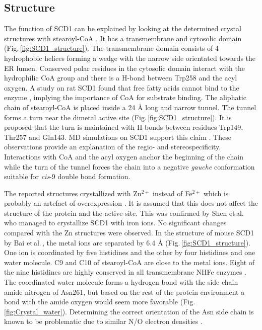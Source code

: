 \subsection{Structure}
The function of SCD1 can be explained by looking at the determined crystal structures with stearoyl-CoA \cite{Bai2015,Wang2015}. It has a transmembrane and cytosolic domain (Fig.\,\ref{fig:SCD1_structure}). The transmembrane domain consists of 4 hydrophobic helices forming a wedge with the narrow side orientated towards the ER lumen. Conserved polar residues in the cytosolic domain interact with the hydrophilic CoA group and there is a H-bond between Trp258 and the acyl oxygen. A study on rat SCD1 found that free fatty acids cannot bind to the enzyme \cite{Enoch1976}, implying the importance of CoA for substrate binding. The aliphatic chain of stearoyl-CoA is placed inside a 24 Å long and narrow tunnel. The tunnel forms a turn near the dimetal active site (Fig.\,\ref{fig:SCD1_structure}). It is proposed that the turn is maintained with H-bonds between residues Trp149, Thr257 and Gln143. MD simulations on SCD1 support this claim \cite{Petroff2021}. These observations provide an explanation of the regio- and stereospecificity. Interactions with CoA and the acyl oxygen anchor the beginning of the chain while the turn of the tunnel forces the chain into a negative \textit{gauche} conformation suitable for \textit{cis}-9 double bond formation. 

The reported structures crystallized with Zn$^{2+}$ instead of Fe$^{2+}$ which is probably an artefact of overexpression \cite{Bai2015,Wang2015}. It is assumed that this does not affect the structure of the protein and the active site. This was confirmed by Shen et\,al.\,\cite{Shen2020} who managed to crystallize SCD1 with iron ions. No significant changes compared with the Zn structures were observed. In the structure of mouse SCD1 by Bai et\,al.\,\cite{Bai2015}, the metal ions are separated by 6.4 Å (Fig.\,\ref{fig:SCD1_structure}). One ion is coordinated by five histidines and the other by four histidines and one water molecule. C9 and C10 of stearoyl-CoA are close to the metal ions. Eight of the nine histidines are highly conserved in all transmembrane NHFe enzymes \cite{Shanklin1994}. The coordinated water molecule forms a hydrogen bond with the side chain amide nitrogen of Asn261, but based on the rest of the protein environment a bond with the amide oxygen would seem more favorable (Fig.\,\ref{fig:Crystal_water}). Determining the correct orientation of the Asn side chain is known to be problematic due to similar N/O electron densities \cite{Word1999}.


